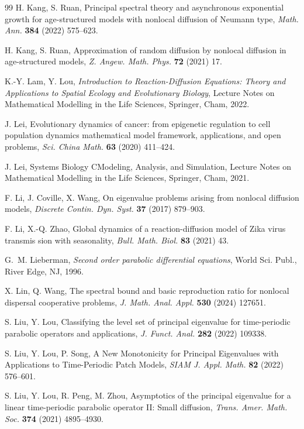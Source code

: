 \documentclass[11pt,reqno]{amsart}
\numberwithin{equation}{section}
\begin{document}
\begin{thebibliography}{99}
H. Kang, S. Ruan, Principal spectral theory and asynchronous exponential growth for age-structured models with nonlocal diffusion of Neumann type, \emph{Math. Ann.} {\bf 384} (2022) 575--623.


H. Kang, S. Ruan, Approximation of random diffusion by nonlocal diffusion in age-structured models, \emph{Z. Angew. Math. Phys.} {\bf 72} (2021) 17.


 K.-Y. Lam, Y. Lou, {\it Introduction to Reaction-Diffusion Equations: Theory and Applications to Spatial Ecology and Evolutionary Biology}, Lecture Notes on Mathematical Modelling in the Life Sciences, Springer, Cham, 2022.



 J. Lei, Evolutionary dynamics of cancer: from epigenetic regulation to cell population dynamics  mathematical
model framework, applications, and open problems, \emph{Sci. China Math.} {\bf 63} (2020) 411--424.

 J. Lei, Systems Biology CModeling, Analysis, and Simulation, Lecture Notes on Mathematical Modelling in the Life
Sciences, Springer, Cham, 2021.


 F. Li, J. Coville, X. Wang, On eigenvalue problems arising from nonlocal diffusion models, \emph{Discrete Contin. Dyn. Syst.} {\bf 37} (2017) 879--903.

 F. Li, X.-Q. Zhao, Global dynamics of a reaction-diffusion model of Zika virus transmis
sion with seasonality, \emph{Bull. Math. Biol.} {\bf 83} (2021) 43.

 G.~M. Lieberman, {\it Second order parabolic differential equations}, World Sci. Publ., River Edge, NJ, 1996.


 X. Lin, Q. Wang, The spectral bound and basic reproduction ratio for nonlocal dispersal cooperative problems, \emph{J. Math. Anal. Appl.} {\bf 530} (2024) 127651.



 S. Liu, Y. Lou, Classifying the level set of principal eigenvalue for time-periodic parabolic operators and applications, \emph{J. Funct. Anal.} {\bf 282} (2022) 109338.


 S. Liu, Y. Lou, P. Song, A New Monotonicity for Principal Eigenvalues with Applications to Time-Periodic Patch Models, \emph{SIAM J. Appl. Math.} {\bf 82} (2022) 576--601.



S. Liu, Y. Lou, R. Peng, M. Zhou,  Asymptotics of the principal eigenvalue for a linear time-periodic parabolic operator II: Small diffusion, \emph{Trans. Amer. Math. Soc.} {\bf 374} (2021) 4895--4930.




\end{thebibliography}
\end{document}
